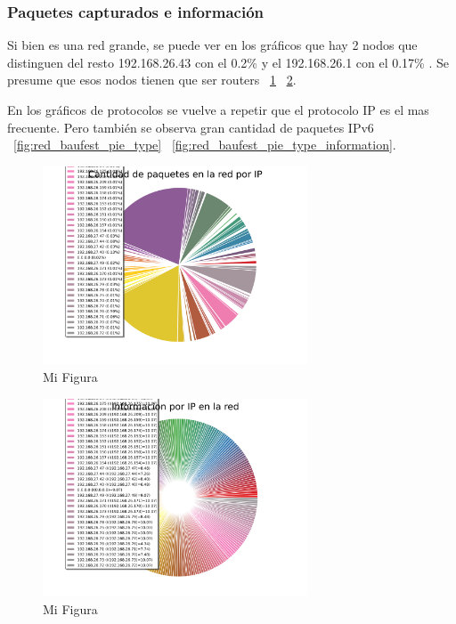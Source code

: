 \FloatBarrier

\subsubsection{Paquetes capturados e información}

Si bien es una red grande, se puede ver en los gráficos que hay 2 nodos que distinguen del resto  192.168.26.43 con el 0.2\% y el 192.168.26.1 con el 0.17\% .
Se presume que esos nodos tienen que ser routers ~\ref{fig:red_baufest_pie_arp} ~\ref{fig:red_baufest_pie_arp_information}. 

En los gráficos de protocolos se vuelve a repetir que el protocolo IP es el mas frecuente. Pero también se observa gran cantidad de paquetes IPv6 ~\ref{fig:red_baufest_pie_type} ~\ref{fig:red_baufest_pie_type_information}. 

\begin{figure}[h!]
  \centering
   \includegraphics[width=0.7\textwidth]{graficos/red_baufest_pie_arp.png}
  \caption{Mi Figura}
  \label{fig:red_baufest_pie_arp}
\end{figure}

\begin{figure}[h!]
  \centering
   \includegraphics[width=0.7\textwidth]{graficos/red_baufest_pie_arp_information.png}
  \caption{Mi Figura}
  \label{fig:red_baufest_pie_arp_information}
\end{figure}

